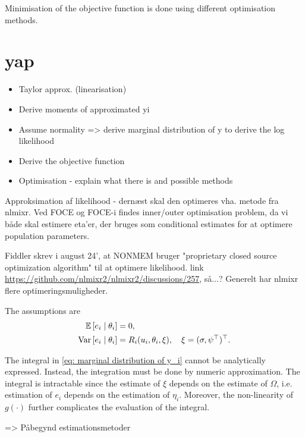 Minimisation of the objective function is done using different optimisation methods.

\section{yap}
\begin{itemize} 
    \item Taylor approx. (linearisation)
    \item Derive moments of approximated yi
    \item Assume normality => derive marginal distribution of y to derive the log likelihood
    \item Derive the objective function
    \item Optimisation - explain what there is and possible methods
\end{itemize}
Approksimation af likelihood - dernæst skal den optimeres vha. metode fra nlmixr. Ved FOCE og FOCE-i findes inner/outer optimisation problem, da vi både skal estimere eta'er, der bruges som conditional estimates for at optimere population parameters.

Fiddler skrev i august 24', at NONMEM bruger "proprietary closed source optimization algorithm" til at optimere likelihood. link \url{https://github.com/nlmixr2/nlmixr2/discussions/257}, så...? Generelt har nlmixr flere optimeringsmuligheder.



The assumptions are
\begin{align*}
    \mathbb{E}\left[{e_i \mid  \theta_i}\right]&=0,\\
    \text{Var}\left[{e_i\mid \theta_i}\right]&=R_i(u_i,\theta_i,\xi), \quad \xi=(\sigma,\psi^\top)^\top.
\end{align*}

The integral in \eqref{eq: marginal distribution of y_i} cannot be analytically expressed. Instead, the integration must be done by numeric approximation. The integral is intractable since the estimate of $\xi$ depends on the estimate of $\Omega$, i.e. estimation of $e_i$ depends on the estimation of $\eta_i$. Moreover, the non-linearity of $g(\cdot)$ further complicates the evaluation of the integral.


=> Påbegynd estimationsmetoder


